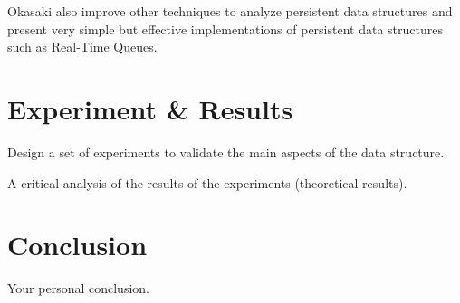 \documentclass[12pt, a4paper]{article} %
\begin{document}
Okasaki also improve other techniques to analyze persistent data structures and present very simple but effective implementations of persistent data structures such as Real-Time Queues.





















\section{Experiment \& Results}%
\label{sec:experiment}

Design a set of experiments to validate the main aspects of the data structure.

A critical analysis of the results of the experiments (theoretical results).




















\section{Conclusion}%
\label{sec:conclusion}

Your personal conclusion.
























\end{document}
